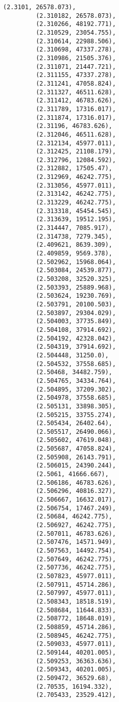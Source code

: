 \documentclass[11pt]{article}
\begin{document}
\begin{Verbatim}[commandchars=\\\{\}]
         (2.3101, 26578.073),
         (2.310182, 26578.073),
         (2.310266, 48192.771),
         (2.310529, 23054.755),
         (2.310614, 22988.506),
         (2.310698, 47337.278),
         (2.310986, 21505.376),
         (2.311071, 21447.721),
         (2.311155, 47337.278),
         (2.311241, 47058.824),
         (2.311327, 46511.628),
         (2.311412, 46783.626),
         (2.311789, 17316.017),
         (2.311874, 17316.017),
         (2.31196, 46783.626),
         (2.312046, 46511.628),
         (2.312134, 45977.011),
         (2.312425, 21108.179),
         (2.312796, 12084.592),
         (2.312882, 17505.47),
         (2.312969, 46242.775),
         (2.313056, 45977.011),
         (2.313142, 46242.775),
         (2.313229, 46242.775),
         (2.313318, 45454.545),
         (2.313639, 19512.195),
         (2.314447, 7085.917),
         (2.314738, 7279.345),
         (2.409621, 8639.309),
         (2.409859, 9569.378),
         (2.502962, 15968.064),
         (2.503084, 24539.877),
         (2.503208, 32520.325),
         (2.503393, 25889.968),
         (2.503624, 19230.769),
         (2.503791, 20100.503),
         (2.503897, 29304.029),
         (2.504003, 37735.849),
         (2.504108, 37914.692),
         (2.504192, 42328.042),
         (2.504319, 37914.692),
         (2.504448, 31250.0),
         (2.504532, 37558.685),
         (2.50468, 34482.759),
         (2.504765, 34334.764),
         (2.504895, 37209.302),
         (2.504978, 37558.685),
         (2.505131, 33898.305),
         (2.505215, 33755.274),
         (2.505434, 26402.64),
         (2.505517, 26490.066),
         (2.505602, 47619.048),
         (2.505687, 47058.824),
         (2.505908, 26143.791),
         (2.506015, 24390.244),
         (2.5061, 41666.667),
         (2.506186, 46783.626),
         (2.506296, 40816.327),
         (2.506667, 16632.017),
         (2.506754, 17467.249),
         (2.50684, 46242.775),
         (2.506927, 46242.775),
         (2.507011, 46783.626),
         (2.507476, 14571.949),
         (2.507563, 14492.754),
         (2.507649, 46242.775),
         (2.507736, 46242.775),
         (2.507823, 45977.011),
         (2.507911, 45714.286),
         (2.507997, 45977.011),
         (2.508343, 18518.519),
         (2.508684, 11644.833),
         (2.508772, 18648.019),
         (2.508859, 45714.286),
         (2.508945, 46242.775),
         (2.509033, 45977.011),
         (2.509144, 40201.005),
         (2.509253, 36363.636),
         (2.509343, 40201.005),
         (2.509472, 36529.68),
         (2.70535, 16194.332),
         (2.705433, 23529.412),

\end{Verbatim}
\end{document}
